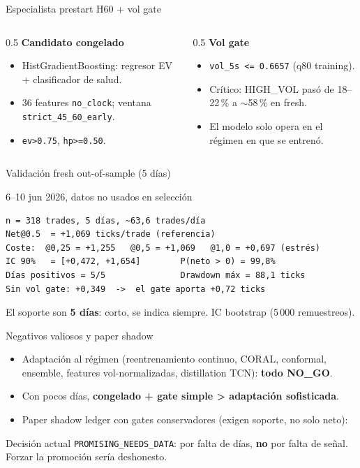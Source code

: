 \documentclass[aspectratio=169,11pt]{beamer}
\begin{document}
\begin{frame}{Especialista prestart H60 + vol gate}
  \begin{columns}
  \begin{column}{0.5\textwidth}
  \textbf{Candidato congelado}
  \begin{itemize}
    \item HistGradientBoosting: regresor EV + clasificador de salud.
    \item 36 features \texttt{no\_clock}; ventana \texttt{strict\_45\_60\_early}.
    \item \texttt{ev>0.75}, \texttt{hp>=0.50}.
  \end{itemize}
  \end{column}
  \begin{column}{0.5\textwidth}
  \textbf{Vol gate}
  \begin{itemize}
    \item \texttt{vol\_5s <= 0.6657} (q80 training).
    \item Crítico: HIGH\_VOL pasó de 18--22\,\% a $\sim$58\,\% en fresh.
    \item El modelo solo opera en el régimen en que se entrenó.
  \end{itemize}
  \end{column}
  \end{columns}
\end{frame}

\begin{frame}[fragile]{Validación fresh out-of-sample (5 días)}
  \scriptsize
  \begin{block}{6--10 jun 2026, datos no usados en selección}
\begin{verbatim}
n = 318 trades, 5 días, ~63,6 trades/día
Net@0.5  = +1,069 ticks/trade (referencia)
Coste:  @0,25 = +1,255   @0,5 = +1,069   @1,0 = +0,697 (estrés)
IC 90%   = [+0,472, +1,654]        P(neto > 0) = 99,8%
Días positivos = 5/5               Drawdown máx = 88,1 ticks
Sin vol gate: +0,349  ->  el gate aporta +0,72 ticks
\end{verbatim}
  \end{block}
  \normalsize
  El soporte son \textbf{5 días}: corto, se indica siempre. IC bootstrap (5\,000
  remuestreos).
\end{frame}

\begin{frame}{Negativos valiosos y paper shadow}
  \begin{itemize}
    \item Adaptación al régimen (reentrenamiento continuo, CORAL, conformal,
      ensemble, features vol-normalizadas, distillation TCN): \textbf{todo NO\_GO}.
    \item Con pocos días, \textbf{congelado + gate simple > adaptación sofisticada}.
    \item Paper shadow ledger con gates conservadores (exigen soporte, no solo
      neto):
  \end{itemize}
  \begin{block}{Decisión actual}
    \texttt{PROMISING\_NEEDS\_DATA}: por falta de días, \textbf{no} por falta de
    señal. Forzar la promoción sería deshonesto.
  \end{block}
\end{frame}
\end{document}

